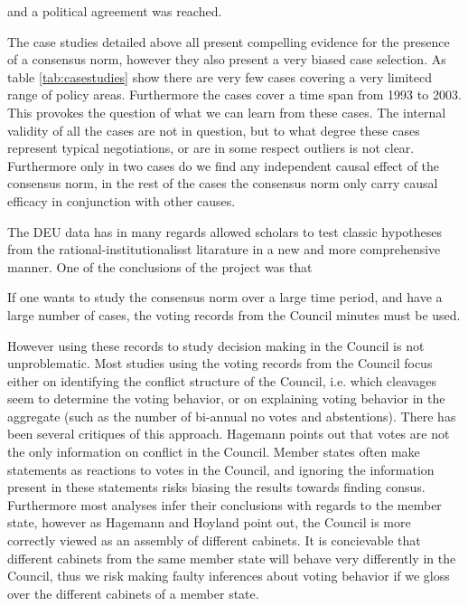 and a political agreement was reached. 

The case studies detailed above all present compelling evidence for the presence of a consensus norm, however they also present a very biased case selection. As table \ref{tab:casestudies} show there are very few cases covering a very limitecd range of policy areas. Furthermore the cases cover a time span from 1993 to 2003. This provokes the question of what we can learn from these cases. The internal validity of all the cases are not in question, but to what degree these cases represent typical negotiations, or are in some respect outliers is not clear. Furthermore only in two cases do we find any independent causal effect of the consensus norm, in the rest of the cases the consensus norm only carry causal efficacy in conjunction with other causes. 


The DEU data has in many regards allowed scholars to test classic hypotheses from the rational-institutionalisst litarature in a new and more comprehensive manner. One of the conclusions of the project was that 








If one wants to study the consensus norm over a large time period, and have a large number of cases, the voting records from the Council minutes must be used. 





However using these records to study decision making in the Council is not unproblematic.  Most studies using the voting records from the Council focus either on identifying the conflict structure of the Council, i.e. which cleavages seem to determine the voting behavior, or on explaining voting behavior in the aggregate (such as the number of bi-annual no votes and abstentions). There has been several critiques of this approach. Hagemann points out that votes are not the only information on conflict in the Council. Member states often make statements as reactions to votes in the Council, and ignoring the information present in these statements risks biasing the results towards finding consus. Furthermore most analyses infer their conclusions with regards to the member state, however as Hagemann and Hoyland point out, the Council is more correctly viewed as an assembly of different cabinets. It is concievable that different cabinets from the same member state will behave very differently in the Council, thus we risk making faulty inferences about voting behavior if we gloss over the different cabinets of a member state. 

